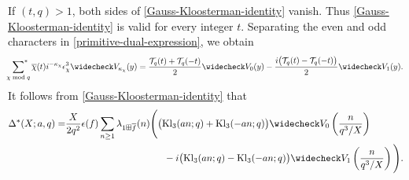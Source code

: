 \documentclass[11pt,reqno]{amsart}
\numberwithin{equation}{section}
\theoremstyle{plain}
\theoremstyle{definition}
\newcommand{\Kl}{\mathrm{Kl}}
\begin{document}
If $(t,q)>1$, both sides of
\eqref{Gauss-Kloosterman-identity} vanish. Thus
\eqref{Gauss-Kloosterman-identity} is valid for every integer $t$.
Separating the even and odd characters in
\eqref{primitive-dual-expression}, we obtain
\[
\begin{split}
\sideset{}{^\ast}\sum_{\chi\bmod q}
\overline{\chi}(t)i^{-\kappa_\chi}\epsilon_\chi^3
\widecheck V_{\kappa_\chi}(y)=
\frac{\mathcal T_q(t)+\mathcal T_q(-t)}{2}\widecheck V_0(y)
-\frac{i\bigl(\mathcal T_q(t)-\mathcal T_q(-t)\bigr)}{2}\widecheck V_1(y).
\end{split}
\]
It follows from \eqref{Gauss-Kloosterman-identity} that
\begin{equation*}\label{primitive-Voronoi}
\begin{split}
\Delta^{\ast}(X;a,q)
=&\frac{X}{2q^2}\epsilon(f)\sum_{n\geq1}\lambda_{1\boxplus\overline f}(n)
\Bigg(\big(\Kl_3(an;q)+\Kl_3(-an;q)\big)\widecheck V_0\left(\frac{n}{q^3/X}\right)
\\&\hspace{36mm}
-i\big(\Kl_3(an;q)-\Kl_3(-an;q)\big)\widecheck V_1\left(\frac{n}{q^3/X}\right)\Bigg).
\end{split}
\end{equation*}
\end{document}
